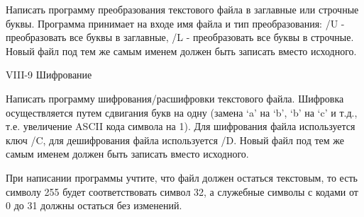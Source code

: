 Написать программу преобразования текстового файла в заглавные или строчные
буквы. Программа принимает на входе имя файла и тип преобразования: /U -
преобразовать все буквы в заглавные, /L - преобразовать все буквы в строчные.
Новый файл под тем же самым именем должен быть записать вместо исходного.



VIII-9 Шифрование

Написать программу шифрования/расшифровки текстового файла. Шифровка
осуществляется путем сдвигания букв на одну (замена ‘a’ на ‘b’, ‘b’ на ‘c’ и
т.д., т.е. увеличение ASCII кода символа на 1). Для шифрования файла
используется ключ /C, для дешифрования файла используется /D. Новый файл под
тем же самым именем должен быть записать вместо исходного.

При написании программы учтите, что файл должен остаться текстовым, то есть
символу 255 будет соответствовать символ 32, а служебные символы с кодами от 0
до 31 должны остаться без изменений.


